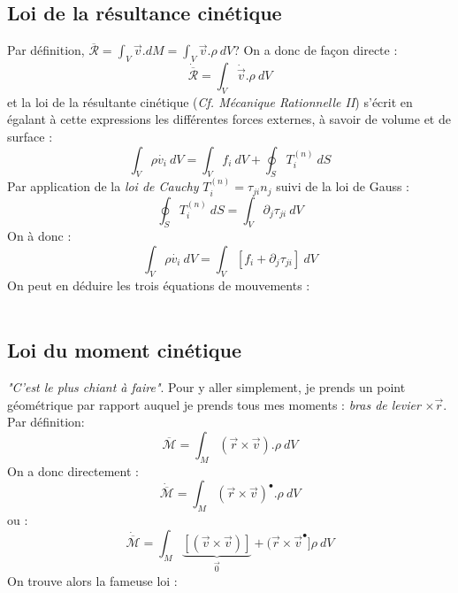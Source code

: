 \subsection{Loi de la résultance cinétique}
Par définition, $\overline{\mathcal{R}} = \int_V \vec{v}.dM = \int_V \vec{v}.\rho\ dV$? On a donc de 
façon directe :
\begin{equation}
	\dot{\overline{\mathcal{R}}} = \int_V \dot{\vec{v}}.\rho\ dV
\end{equation}
et la loi de la résultante cinétique (\textit{Cf. Mécanique Rationnelle II}) s'écrit en égalant à cette
expressions les différentes forces externes, à savoir de volume et de surface :
\begin{equation}
	\int_V \rho \dot{v_i}\ dV = \int_V f_i\ dV + \oint_S T_i^{(n)}\ dS
\end{equation}
Par application de la \textit{loi de Cauchy} $T_i^{(n)} = \tau_{ji}n_j$ suivi de la loi de Gauss :
\begin{equation}
	\oint_S T_i^{(n)}\ dS = \int_V \partial_j \tau_{ji}\ dV
\end{equation}
On à donc :
\begin{equation}
	\int_V \rho \dot{v_i}\ dV = \int_V [f_i +\partial_j \tau_{ji}]\ dV
\end{equation}
On peut en déduire les trois équations de mouvements : \\
\ \\
    
\subsection{Loi du moment cinétique}
\textit{"C'est le plus chiant à faire"}. Pour y aller simplement, je prends un point géométrique par
rapport auquel je prends tous mes moments : \textit{bras de levier} $\times \vec{r}$. Par définition:
\begin{equation}
	\overline{\mathcal{M}} = \int_M (\vec{r}\times\vec{v}).\rho\ dV
\end{equation}
On a donc directement :
\begin{equation}
	\dot{\overline{\mathcal{M}}} = \int_M (\vec{r}\times\vec{v})^\bullet.\rho\ dV
\end{equation}
ou :
\begin{equation}
	\dot{\overline{\mathcal{M}}} = \int_M \underbrace{[(\vec{v}\times\vec{v})]}_{\vec{0}} + (\vec{r}
	\times \vec{v}^\bullet]\rho\ dV
\end{equation}
On trouve alors la fameuse loi :\\
    
